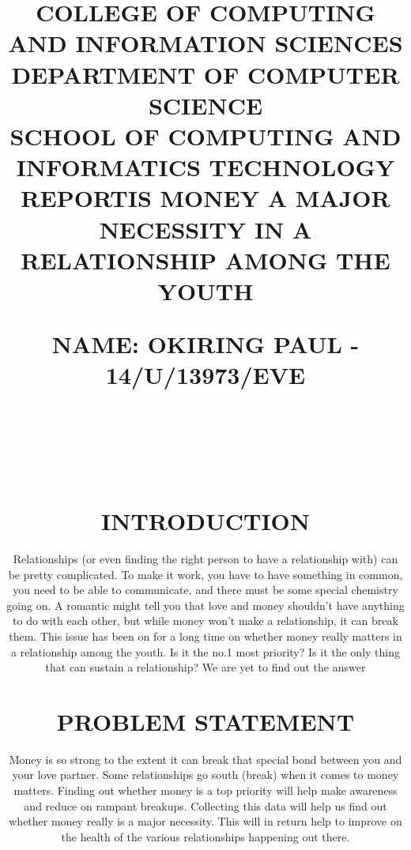 \documentclass[12pt,letterpaper]{article}
\begin{document}
	
	\title{COLLEGE OF COMPUTING AND INFORMATION SCIENCES\\ DEPARTMENT OF COMPUTER SCIENCE\\ SCHOOL OF COMPUTING AND INFORMATICS TECHNOLOGY\\}
	\maketitle
	
	\title{NAME:	         OKIRING PAUL   - 14/U/13973/EVE   
		\maketitle
		\\
		\\
		\begin{center}
			\title {\textbf{REPORT}}
		\end{center}
		\title{\textbf{IS MONEY A MAJOR NECESSITY IN A RELATIONSHIP AMONG THE YOUTH}}
		\maketitle
		
		\section{INTRODUCTION}
		Relationships (or even finding the right person to have a relationship with) can be pretty complicated. To make it work, you have to have something in common, you need to be able to communicate, and there must be some special chemistry going on. A romantic might tell you that love and money shouldn’t have anything to do with each other, but while money won’t make a relationship, it can break them. This issue has been on for a long time on whether money really matters in a relationship among the youth. Is it the no.1 most priority? Is it the only thing that can sustain a relationship? We are yet to find out the answer
		
		\section{PROBLEM STATEMENT}
		Money is so strong to the extent it can break that special bond between you and your love partner. Some relationships go south (break) when it comes to money matters. Finding out whether money is a top priority will help make awareness and reduce on rampant breakups.  Collecting this data will help us find out whether money really is a major necessity. This will in return help to improve on the health of the various relationships happening out there.
		
}
\end{document}
